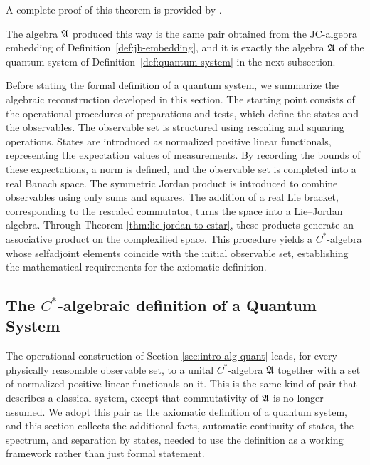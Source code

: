 \noindent A complete proof of this theorem is provided by \cite[p.807]{morettiSpectralTheoryQuantum}.

\begin{remark}
	The algebra $\mathfrak{A}$ produced this way is the same pair obtained from the
	JC-algebra embedding of Definition~\ref{def:jb-embedding}, and it is
	exactly the algebra $\mathfrak{A}$ of the quantum system of
	Definition~\ref{def:quantum-system} in the next subsection.
\end{remark}

Before stating the formal definition of a quantum system, we summarize the algebraic reconstruction developed in this section. The starting point consists of the operational procedures of preparations and tests, which define the states and the observables. The observable set is structured using rescaling and squaring operations. States are introduced as normalized positive linear functionals, representing the expectation values of measurements. By recording the bounds of these expectations, a norm is defined, and the observable set is completed into a real Banach space. The symmetric Jordan product is introduced to combine observables using only sums and squares. The addition of a real Lie bracket, corresponding to the rescaled commutator, turns the space into a Lie--Jordan algebra. Through Theorem \ref{thm:lie-jordan-to-cstar}, these products generate an associative product on the complexified space. This procedure yields a $C^*$-algebra whose selfadjoint elements coincide with the initial observable set, establishing the mathematical requirements for the axiomatic definition.

\subsection*{The $C^*$-algebraic definition of a Quantum System}\label{sec:alg-quant-sys}

The operational construction of Section \ref{sec:intro-alg-quant} leads, for every physically
reasonable observable set, to a unital $C^*$-algebra $\mathfrak{A}$ together with
a set of normalized positive linear functionals on it. This is
the same kind of pair that describes a classical system, except that
commutativity of $\mathfrak{A}$ is no longer assumed. We adopt this pair as the
axiomatic definition of a quantum system, and this section collects the
additional facts, automatic continuity of states, the spectrum, and
separation by states, needed to use the definition as a working framework
rather than just formal statement.

